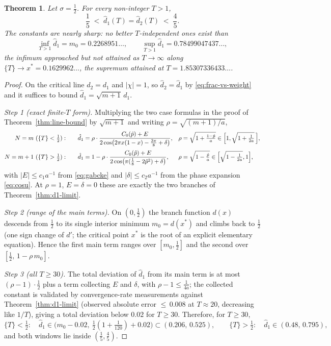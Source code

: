 \documentclass[11pt]{article}
\newtheorem{theorem}{Theorem}[section]
\theoremstyle{definition}
\begin{document}
\begin{theorem}\label{thm:d1-bounds}
Let $\sigma=\tfrac12$. For every non-integer $T>1$,
\[
\frac15\;<\;\hat d_1(T)=\hat d_2(T)\;<\;\frac45 .
\]
The constants are nearly sharp: no better $T$-independent ones exist than
\[
\inf_{T>1}\hat d_1=m_0=0.2268951\ldots,
\qquad
\sup_{T>1}\hat d_1=0.78499047437\ldots,
\]
the infimum approached but not attained as $T\to\infty$ along
$\{T\}\to x^{*}=0.1629962\ldots$, the supremum attained at
$T=1.85307336433\ldots$.
\end{theorem}

\begin{proof}
On the critical line $d_2=d_1$ and $|\chi|=1$, so $\hat d_2=\hat d_1$ by
\eqref{eq:frac-vs-weight} and it suffices to bound
$\hat d_1=\sqrt{m+1}\,d_1$.

\emph{Step 1 (exact finite-$T$ form).} Multiplying the two case formulas
in the proof of Theorem~\ref{thm:line-bound} by $\sqrt{m+1}$ and
writing $\rho=\sqrt{(m+1)/a}$,
\begin{align*}
N=m\ (\{T\}<\tfrac12):&\qquad
\hat d_1=\rho\cdot
\frac{C_0(\hat p)+E}{2\cos\bigl(2\pi x(1-x)-\tfrac{3\pi}8+\delta\bigr)},
&&\rho=\sqrt{1+\tfrac{1-\hat p}{a}}
\in\Bigl[1,\sqrt{1+\tfrac1{2a}}\,\Bigr],\\[2pt]
N=m+1\ (\{T\}>\tfrac12):&\qquad
\hat d_1=1-\rho\cdot
\frac{C_0(\hat p)+E}{2\cos\bigl(\pi(\tfrac18-2\hat p^{2})+\delta\bigr)},
&&\rho=\sqrt{1-\tfrac{\hat p}{a}}
\in\Bigl[\sqrt{1-\tfrac1{2a}},1\Bigr],
\end{align*}
with $|E|\leq c_1a^{-1}$ from \eqref{eq:gabcke} and $|\delta|\leq
c_2a^{-1}$ from the phase expansion \eqref{eq:cosu}. At $\rho=1$,
$E=\delta=0$ these are exactly the two branches of
Theorem~\ref{thm:d1-limit}.

\emph{Step 2 (range of the main terms).} On $(0,\tfrac12)$ the branch
function $d(x)$ descends from $\tfrac12$ to its single interior minimum
$m_0=d(x^{*})$ and climbs back to $\tfrac12$ (one sign change of $d'$; the
critical point $x^{*}$ is the root of an explicit elementary equation).
Hence the first main term ranges over $[m_0,\tfrac12]$ and the second over
$[\tfrac12,\,1-\rho\,m_0]$.

\emph{Step 3 (all $T\geq30$).} The total deviation of $\hat d_1$ from its
main term is at most $(\rho-1)\cdot\tfrac12$ plus a term collecting $E$
and $\delta$, with $\rho-1\leq\tfrac1{4a}$; the collected constant is
validated by convergence-rate measurements against
Theorem~\ref{thm:d1-limit} (observed absolute error ${\leq}\,0.008$ at
$T\approx20$, decreasing like $1/T$), giving a total deviation below
$0.02$ for $T\geq30$. Therefore, for $T\geq30$,
\[
\{T\}<\tfrac12:\quad
\hat d_1\in\bigl(m_0-0.02,\ \tfrac12(1+\tfrac1{120})+0.02\bigr)
\subset(0.206,\,0.525),
\qquad
\{T\}>\tfrac12:\quad
\hat d_1\in(0.48,\,0.795),
\]
and both windows lie inside $(\tfrac15,\tfrac45)$.


\end{proof}
\end{document}
